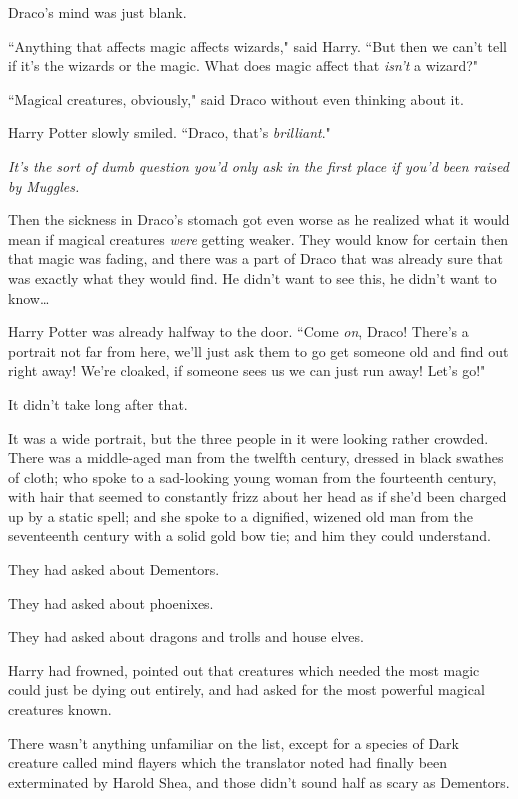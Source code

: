 Draco's mind was just blank.

``Anything that affects magic affects wizards," said Harry. ``But then we can't tell if it's the wizards or the magic. What does magic affect that \emph{isn't} a wizard?"

``Magical creatures, obviously," said Draco without even thinking about it.

Harry Potter slowly smiled. ``Draco, that's \emph{brilliant}."

\emph{It's the sort of dumb question you'd only ask in the first place if you'd been raised by Muggles.}

Then the sickness in Draco's stomach got even worse as he realized what it would mean if magical creatures \emph{were} getting weaker. They would know for certain then that magic was fading, and there was a part of Draco that was already sure that was exactly what they would find. He didn't want to see this, he didn't want to know{\ldots}

Harry Potter was already halfway to the door. ``Come \emph{on}, Draco! There's a portrait not far from here, we'll just ask them to go get someone old and find out right away! We're cloaked, if someone sees us we can just run away! Let's go!"

\later

It didn't take long after that.

It was a wide portrait, but the three people in it were looking rather crowded. There was a middle-aged man from the twelfth century, dressed in black swathes of cloth; who spoke to a sad-looking young woman from the fourteenth century, with hair that seemed to constantly frizz about her head as if she'd been charged up by a static spell; and she spoke to a dignified, wizened old man from the seventeenth century with a solid gold bow tie; and him they could understand.

They had asked about Dementors.

They had asked about phoenixes.

They had asked about dragons and trolls and house elves.

Harry had frowned, pointed out that creatures which needed the most magic could just be dying out entirely, and had asked for the most powerful magical creatures known.

There wasn't anything unfamiliar on the list, except for a species of Dark creature called mind flayers which the translator noted had finally been exterminated by Harold Shea, and those didn't sound half as scary as Dementors.

